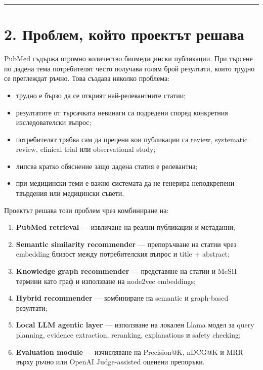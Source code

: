 \documentclass[12pt,a4paper]{article}
\providecommand{\tightlist}{\setlength{\itemsep}{0pt}\setlength{\parskip}{0pt}}
\begin{document}
\vspace{0.5em}\hrule\vspace{1.0em}

\section{2. Проблем, който проектът решава}\label{ux43fux440ux43eux431ux43bux435ux43c-ux43aux43eux439ux442ux43e-ux43fux440ux43eux435ux43aux442ux44aux442-ux440ux435ux448ux430ux432ux430}

PubMed съдържа огромно количество биомедицински публикации. При търсене по дадена тема потребителят често получава голям брой резултати, които трудно се преглеждат ръчно. Това създава няколко проблема:

\begin{itemize}
\tightlist
\item
  трудно е бързо да се открият най-релевантните статии;
\item
  резултатите от търсачката невинаги са подредени според конкретния изследователски въпрос;
\item
  потребителят трябва сам да прецени кои публикации са review, systematic review, clinical trial или observational study;
\item
  липсва кратко обяснение защо дадена статия е релевантна;
\item
  при медицински теми е важно системата да не генерира неподкрепени твърдения или медицински съвети.
\end{itemize}

Проектът решава този проблем чрез комбиниране на:

\begin{enumerate}
\def\labelenumi{\arabic{enumi}.}
\tightlist
\item
  \textbf{PubMed retrieval} --- извличане на реални публикации и метаданни;
\item
  \textbf{Semantic similarity recommender} --- препоръчване на статии чрез embedding близост между потребителския въпрос и title + abstract;
\item
  \textbf{Knowledge graph recommender} --- представяне на статии и MeSH термини като граф и използване на node2vec embeddings;
\item
  \textbf{Hybrid recommender} --- комбиниране на semantic и graph-based резултати;
\item
  \textbf{Local LLM agentic layer} --- използване на локален Llama модел за query planning, evidence extraction, reranking, explanations и safety checking;
\item
  \textbf{Evaluation module} --- изчисляване на Precision@K, nDCG@K и MRR върху ръчно или OpenAI Judge-assisted оценени препоръки.
\end{enumerate}
\end{document}
